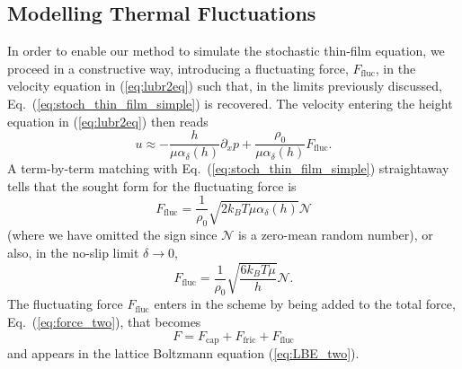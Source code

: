 \subsection{Modelling Thermal Fluctuations}\label{subsec:thermal_fluc_model}
In order to enable our method to simulate the stochastic thin-film equation, we proceed in a constructive way,
introducing a fluctuating force, $F_{\text{fluc}}$, in the velocity equation in (\ref{eq:lubr2eq}) such that, in the limits previously discussed, Eq.~(\ref{eq:stoch_thin_film_simple}) is recovered. The velocity entering the height equation in (\ref{eq:lubr2eq}) 
then reads
\begin{equation}
u \approx -\frac{h}{\mu \alpha_{\delta}(h)}\partial_x p + \frac{\rho_0}{\mu \alpha_{\delta}(h)}F_{\text{fluc}}.
\end{equation}
A term-by-term matching with Eq.~(\ref{eq:stoch_thin_film_simple}) straightaway tells that the sought form for the fluctuating force is
\begin{equation}
    F_{\text{fluc}} = \frac{1}{\rho_0} \sqrt{2 k_B T \mu \alpha_{\delta}(h)}\mathcal{N}
\end{equation}
(where we have omitted the sign since $\mathcal{N}$ is a zero-mean random number), or also, in the no-slip 
limit $\delta \rightarrow 0$, 
\begin{equation}\label{eq:thermal_force}
    F_{\text{fluc}} = \frac{1}{\rho_0}\sqrt{\frac{6k_BT\mu}{h}}\mathcal{N}.
\end{equation}
The fluctuating force $F_{\text{fluc}}$ enters in the scheme by being added to the total force, Eq.~(\ref{eq:force_two}), that becomes
\begin{equation}\label{eq:tot_force}
F = F_{\text{cap}} + F_{\text{fric}} + F_{\text{fluc}}
\end{equation}
and appears in the lattice Boltzmann equation (\ref{eq:LBE_two}).

